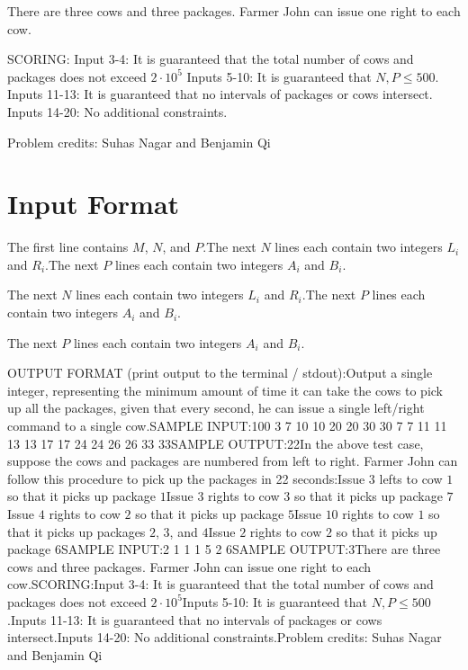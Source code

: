 \documentclass[12pt]{article}
\begin{document}
There are three cows and three packages. Farmer John can issue one right to each
cow.

SCORING:
 Input 3-4: It is guaranteed that the total number of cows and packages does
not exceed $2 \cdot 10^5$  Inputs 5-10: It is guaranteed that
$N, P \le 500$.  Inputs 11-13: It is guaranteed that no intervals of packages or cows
intersect.  Inputs 14-20: No additional constraints. 


Problem credits: Suhas Nagar and Benjamin Qi



\section*{Input Format}
The first line contains $M$, $N$, and $P$.The next $N$ lines each contain two integers $L_i$ and $R_i$.The next $P$ lines each contain two integers $A_i$ and $B_i$.

The next $N$ lines each contain two integers $L_i$ and $R_i$.The next $P$ lines each contain two integers $A_i$ and $B_i$.

The next $P$ lines each contain two integers $A_i$ and $B_i$.

OUTPUT FORMAT (print output to the terminal / stdout):Output a single integer, representing the minimum amount of time it can take the
cows to pick up all the packages, given that every second, he can issue a single
left/right command to a single cow.SAMPLE INPUT:100 3 7
10 10
20 20
30 30
7 7
11 11
13 13
17 17
24 24
26 26
33 33SAMPLE OUTPUT:22In the above test case, suppose the cows and packages are numbered from left to
right. Farmer John can follow this procedure to pick up the packages in 22
seconds:Issue $3$ lefts to cow $1$ so that it picks up package $1$Issue
$3$ rights to cow $3$ so that it picks up package $7$Issue $4$ rights
to cow $2$ so that it picks up package $5$Issue $10$ rights to cow $1$
so that it picks up packages $2$, $3$, and $4$Issue $2$ rights to cow
$2$ so that it picks up package $6$SAMPLE INPUT:2 1 1
1 5
2 6SAMPLE OUTPUT:3There are three cows and three packages. Farmer John can issue one right to each
cow.SCORING:Input 3-4: It is guaranteed that the total number of cows and packages does
not exceed $2 \cdot 10^5$Inputs 5-10: It is guaranteed that
$N, P \le 500$.Inputs 11-13: It is guaranteed that no intervals of packages or cows
intersect.Inputs 14-20: No additional constraints.Problem credits: Suhas Nagar and Benjamin Qi
\end{document}
